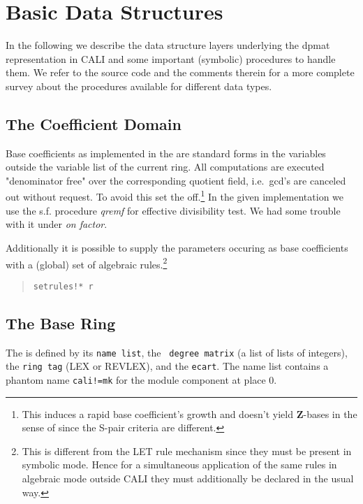 \section{Basic Data Structures}

In the following we describe the data structure layers underlying the
dpmat representation in CALI and some important (symbolic) procedures
to handle them. We refer to the source code and the comments therein for
a more complete survey about the procedures available for different
data types.

\subsection{The Coefficient Domain}

Base coefficients as implemented in the  are standard
forms in the variables outside the variable list of the current
ring. All computations are executed "denominator free" over the
corresponding quotient field, i.e.\ gcd's are canceled out without
request. To avoid this set the  off.\footnote{This
induces a rapid base coefficient's growth and doesn't yield {\bf
Z}-\gr bases in the sense of \cite{GTZ} since the S-pair criteria are
different.} In the given implementation we use the s.f. procedure {\em
qremf} for effective divisibility test. We had some trouble with it
under {\em on factor}.

Additionally it is possible to supply the
parameters occuring as base coefficients with a (global) set of
algebraic rules.\footnote{This is different from the LET rule
mechanism since they must be present in symbolic mode. Hence for a
simultaneous application of the same rules in algebraic mode outside
CALI they must additionally be declared in the usual way.}
\begin{quote}
\verb|setrules!* r|

\end{quote}

\subsection{The Base Ring}

The  is defined by its {\tt name list}, the {\tt
degree matrix} (a list of lists of integers), the {\tt ring tag} (LEX
or REVLEX), and the {\tt ecart}. The name list contains a phantom
name {\tt cali!=mk} for the module component at place 0.
\medskip

